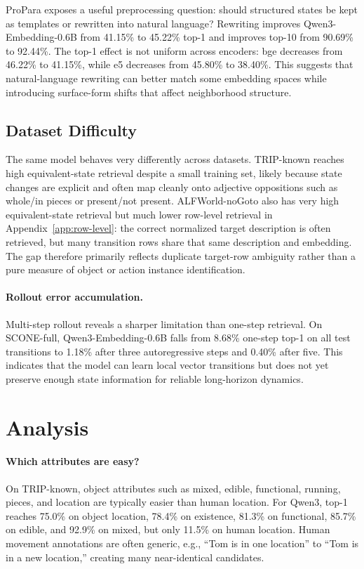 \documentclass{article}
\begin{document}
ProPara exposes a useful preprocessing question: should structured states be kept as templates or rewritten into natural language? Rewriting improves Qwen3-Embedding-0.6B from 41.15\% to 45.22\% top-1 and improves top-10 from 90.69\% to 92.44\%. The top-1 effect is not uniform across encoders: bge decreases from 46.22\% to 41.15\%, while e5 decreases from 45.80\% to 38.40\%. This suggests that natural-language rewriting can better match some embedding spaces while introducing surface-form shifts that affect neighborhood structure.

\subsection{Dataset Difficulty}

The same model behaves very differently across datasets. TRIP-known reaches high equivalent-state retrieval despite a small training set, likely because state changes are explicit and often map cleanly onto adjective oppositions such as whole/in pieces or present/not present. ALFWorld-noGoto also has very high equivalent-state retrieval but much lower row-level retrieval in Appendix~\ref{app:row-level}: the correct normalized target description is often retrieved, but many transition rows share that same description and embedding. The gap therefore primarily reflects duplicate target-row ambiguity rather than a pure measure of object or action instance identification.

\paragraph{Rollout error accumulation.}
Multi-step rollout reveals a sharper limitation than one-step retrieval. On SCONE-full, Qwen3-Embedding-0.6B falls from 8.68\% one-step top-1 on all test transitions to 1.18\% after three autoregressive steps and 0.40\% after five. This indicates that the model can learn local vector transitions but does not yet preserve enough state information for reliable long-horizon dynamics.

\section{Analysis}

\paragraph{Which attributes are easy?}
On TRIP-known, object attributes such as mixed, edible, functional, running, pieces, and location are typically easier than human location. For Qwen3, top-1 reaches 75.0\% on object location, 78.4\% on existence, 81.3\% on functional, 85.7\% on edible, and 92.9\% on mixed, but only 11.5\% on human location. Human movement annotations are often generic, e.g., ``Tom is in one location'' to ``Tom is in a new location,'' creating many near-identical candidates.
\end{document}
